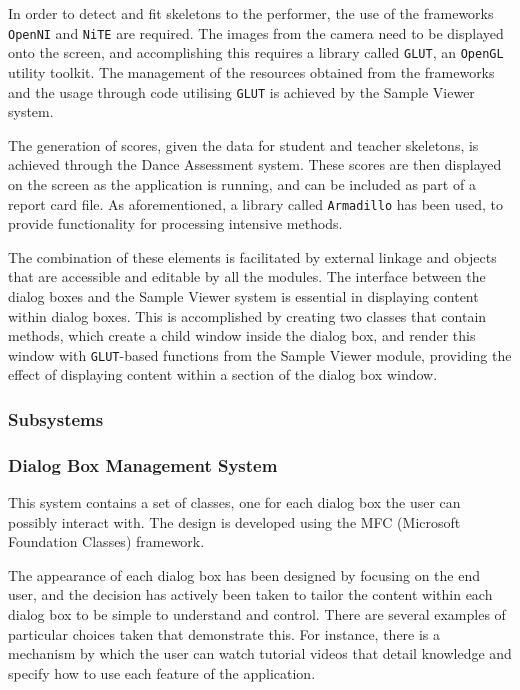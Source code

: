 \documentclass[11pt,a4paper]{article}
\begin{document}
\noindent
In order to detect and fit skeletons to the performer, the use of the frameworks \texttt{OpenNI} and \texttt{NiTE} are required. The images from the camera need to be displayed onto the screen, and accomplishing this requires a library called \texttt{GLUT}, an \texttt{OpenGL} utility toolkit. The management of the resources obtained from the frameworks and the usage through code utilising \texttt{GLUT} is achieved by the Sample Viewer system.

\noindent
The generation of scores, given the data for student and teacher skeletons, is achieved through the Dance Assessment system. These scores are then displayed on the screen as the application is running, and can be included as part of a report card file. As aforementioned, a library called \texttt{Armadillo} has been used, to provide functionality for processing intensive methods.

\noindent
The combination of these elements is facilitated by external linkage and objects that are accessible and editable by all the modules. The interface between the dialog boxes and the Sample Viewer system is essential in displaying content within dialog boxes. This is accomplished by creating two classes that contain methods, which create a child window inside the dialog box, and render this window with \texttt{GLUT}-based functions from the Sample Viewer module, providing the effect of displaying content within a section of the dialog box window.

\subsubsection{Subsystems}

\subsubsection*{Dialog Box Management System}

This system contains a set of classes, one for each dialog box the user can possibly interact with. The design is developed using the MFC (Microsoft Foundation Classes) framework.

\noindent
The appearance of each dialog box has been designed by focusing on the end user, and the decision has actively been taken to tailor the content within each dialog box to be simple to understand and control. There are several examples of particular choices taken that demonstrate this. For instance, there is a mechanism by which the user can watch tutorial videos that detail knowledge and specify how to use each feature of the application.
\end{document}
